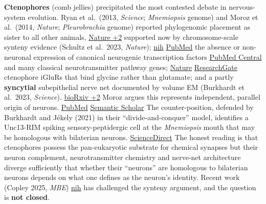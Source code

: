 \textbf{Ctenophores} (comb jellies) precipitated the most contested debate in nervous-system evolution. Ryan et al.~(2013, \emph{Science}; \emph{Mnemiopsis} genome) and Moroz et al.~(2014, \emph{Nature}; \emph{Pleurobrachia} genome) reported phylogenomic placement as sister to all other animals, \href{https://www.nature.com/articles/nature13400}{Nature +2} supported now by chromosome-scale synteny evidence (Schultz et al.~2023, \emph{Nature}); \href{https://www.ncbi.nlm.nih.gov/pmc/articles/PMC10232365/}{nih} \href{https://pubmed.ncbi.nlm.nih.gov/37198475/}{PubMed} the absence or non-neuronal expression of canonical neurogenic transcription factors \href{https://pmc.ncbi.nlm.nih.gov/articles/PMC4337882/}{PubMed Central} and many classical neurotransmitter pathway genes; \href{https://www.nature.com/articles/nature13400}{Nature} \href{https://www.researchgate.net/publication/370154444_Syncytial_nerve_net_in_a_ctenophore_adds_insights_on_the_evolution_of_nervous_systems}{ResearchGate} ctenophore iGluRs that bind glycine rather than glutamate; and a partly \textbf{syncytial} subepithelial nerve net documented by volume EM (Burkhardt et al.~2023, \emph{Science}). \href{https://www.biorxiv.org/content/10.1101/2025.06.26.661250v2.full}{bioRxiv +2} Moroz argues this represents independent, parallel origin of neurons. \href{https://pubmed.ncbi.nlm.nih.gov/25696823/}{PubMed} \href{https://www.semanticscholar.org/paper/Convergent-evolution-of-neural-systems-in-Moroz/7ede2e7fe68e14c1b1578a267cc649ce600a9397}{Semantic Scholar} The counter-position, defended by Burkhardt and Jékely (2021) in their ``divide-and-conquer'' model, identifies a Unc13-RIM spiking sensory-peptidergic cell at the \emph{Mnemiopsis} mouth that may be homologous with bilaterian neurons. \href{https://www.sciencedirect.com/science/article/abs/pii/S095943882100129X}{ScienceDirect} The honest reading is that ctenophores possess the pan-eukaryotic substrate for chemical synapses but their neuron complement, neurotransmitter chemistry and nerve-net architecture diverge sufficiently that whether their ``neurons'' are homologous to bilaterian neurons depends on what one defines as the neuron's identity. Recent work (Copley 2025, \emph{MBE}) \href{https://www.ncbi.nlm.nih.gov/pmc/articles/PMC12728501/}{nih} has challenged the synteny argument, and the question is \textbf{not closed}.

